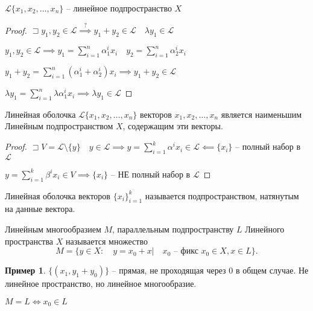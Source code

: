 \documentclass{book}
\newcommand{\ov}[2]{\overset{#1}{#2}}
\theoremstyle{definition}
\newtheorem*{example}{Пример}
\begin{document}
\begin{lemma}
    $\mathscr{L}\{x_1, x_2, \ldots, x_n\}$ -- линейное подпространство $X$ 
\end{lemma}
\begin{proof}
    $\sqsupset y_1, y_2\in \mathscr{L} \ov{?}{\implies } y_1+y_2\in \mathscr{L}\quad \lambda y_1\in\mathscr{L}$

    $y_1, y_2\in \mathscr{L} \implies y_1 = \sum_{i=1}^{n} \alpha_1^ix_i\quad y_2 = \sum_{i=1}^{n} \alpha_2^ix_i$ 

    $y_1+y_2 = \sum_{i=1}^{n} (\alpha_1^i + \alpha_2^i)x_i \implies y_1+y_2\in \mathscr{L}$ 

    $\lambda y_1 = \sum_{i=1}^{n} \lambda \alpha_1^ix_i \implies  \lambda y_1\in \mathscr{L}$
\end{proof}

\begin{lemma}
    Линейная оболочка $\mathscr{L}\{x_1, x_2, \ldots, x_n\}$ векторов $x_1, x_2, \ldots, x_n$ является наименьшим Линейным подпространством $X$, содержащим эти векторы.
\end{lemma}
\begin{proof}
    $\sqsupset V = \mathscr{L} \setminus \{y\}\quad y\in \mathscr{L} \implies y = \sum_{i=1}^{k} \alpha^ix_i \in \mathscr{L} \impliedby \{x_i\}$ -- полный набор в $\mathscr{L}$

    $y = \sum_{i=1}^{k} \beta^ix_i \in V \implies \{x_i\}$ -- НЕ полный набор в $\mathscr{L}$
\end{proof}

\begin{definition}
    Линейная оболочка векторов $\{x_i\}_{i=1}^k$ называется подпространством, натянутым на данные вектора.
\end{definition}

\begin{definition}
    Линейным многообразием $M$, параллельным подпространству  $L$ Линейного пространства  $X$ называется множество \[
        M = \{y\in X:\quad y = x_0+x|\quad x_0\text{ -- фикс } x_0\in X, x\in L\}
    .\] 
\end{definition}
\begin{example}
    $\{(x_1, y_1+y_0)\}$ -- прямая, не проходящая через $0$  в общем случае. Не линейное пространство, но линейное многообразие.
\end{example}

\begin{lemma}
    $M=L \iff x_0\in L$
\end{lemma}
\end{document}
